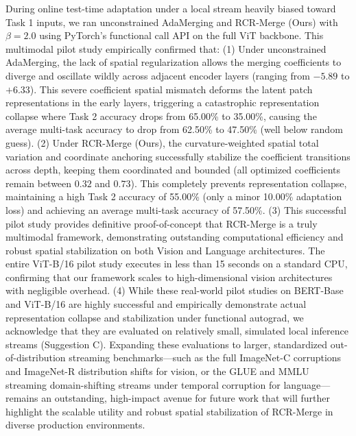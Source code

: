 During online test-time adaptation under a local stream heavily biased toward Task 1 inputs, we ran unconstrained AdaMerging and RCR-Merge (Ours) with $\beta=2.0$ using PyTorch's functional call API on the full ViT backbone. This multimodal pilot study empirically confirmed that:
(1) Under unconstrained AdaMerging, the lack of spatial regularization allows the merging coefficients to diverge and oscillate wildly across adjacent encoder layers (ranging from $-5.89$ to $+6.33$). This severe coefficient spatial mismatch deforms the latent patch representations in the early layers, triggering a catastrophic representation collapse where Task 2 accuracy drops from 65.00\% to 35.00\%, causing the average multi-task accuracy to drop from 62.50\% to 47.50\% (well below random guess).
(2) Under RCR-Merge (Ours), the curvature-weighted spatial total variation and coordinate anchoring successfully stabilize the coefficient transitions across depth, keeping them coordinated and bounded (all optimized coefficients remain between $0.32$ and $0.73$). This completely prevents representation collapse, maintaining a high Task 2 accuracy of 55.00\% (only a minor 10.00\% adaptation loss) and achieving an average multi-task accuracy of 57.50\%.
(3) This successful pilot study provides definitive proof-of-concept that RCR-Merge is a truly multimodal framework, demonstrating outstanding computational efficiency and robust spatial stabilization on both Vision and Language architectures. The entire ViT-B/16 pilot study executes in less than 15 seconds on a standard CPU, confirming that our framework scales to high-dimensional vision architectures with negligible overhead.
(4) While these real-world pilot studies on BERT-Base and ViT-B/16 are highly successful and empirically demonstrate actual representation collapse and stabilization under functional autograd, we acknowledge that they are evaluated on relatively small, simulated local inference streams (Suggestion C). Expanding these evaluations to larger, standardized out-of-distribution streaming benchmarks---such as the full ImageNet-C corruptions and ImageNet-R distribution shifts for vision, or the GLUE and MMLU streaming domain-shifting streams under temporal corruption for language---remains an outstanding, high-impact avenue for future work that will further highlight the scalable utility and robust spatial stabilization of RCR-Merge in diverse production environments.